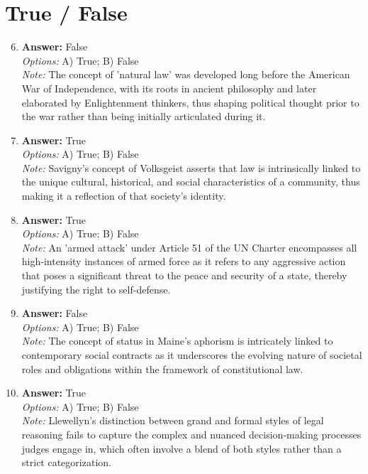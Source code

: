 \documentclass[12pt]{article}
\begin{document}
\section*{True / False}
\begin{enumerate}[label=\arabic*.]
\setcounter{enumi}{5}
\item \textbf{Answer:} False
\\ \textit{Options:} A) True; B) False
\\ \textit{Note:} The concept of 'natural law' was developed long before the American War of Independence, with its roots in ancient philosophy and later elaborated by Enlightenment thinkers, thus shaping political thought prior to the war rather than being initially articulated during it.
\item \textbf{Answer:} True
\\ \textit{Options:} A) True; B) False
\\ \textit{Note:} Savigny's concept of Volksgeist asserts that law is intrinsically linked to the unique cultural, historical, and social characteristics of a community, thus making it a reflection of that society's identity.
\item \textbf{Answer:} True
\\ \textit{Options:} A) True; B) False
\\ \textit{Note:} An 'armed attack' under Article 51 of the UN Charter encompasses all high-intensity instances of armed force as it refers to any aggressive action that poses a significant threat to the peace and security of a state, thereby justifying the right to self-defense.
\item \textbf{Answer:} False
\\ \textit{Options:} A) True; B) False
\\ \textit{Note:} The concept of status in Maine's aphorism is intricately linked to contemporary social contracts as it underscores the evolving nature of societal roles and obligations within the framework of constitutional law.
\item \textbf{Answer:} True
\\ \textit{Options:} A) True; B) False
\\ \textit{Note:} Llewellyn's distinction between grand and formal styles of legal reasoning fails to capture the complex and nuanced decision-making processes judges engage in, which often involve a blend of both styles rather than a strict categorization.
\end{enumerate}
\end{document}
